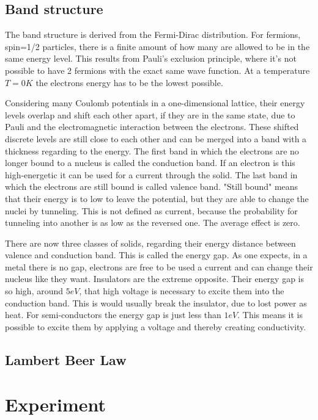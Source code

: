 \documentclass[]{article}
\begin{document}
\subsection{Band structure}
The band structure is derived from the Fermi-Dirac distribution. For fermions, spin=1/2 particles, there is a finite amount of how many are allowed to be in the same energy level. This results from Pauli's exclusion principle, where it's not possible to have 2 fermions with the exact same wave function. At a temperature $T=0K$ the electrons energy has to be the lowest possible. 

Considering many Coulomb potentials in a one-dimensional lattice, their energy levels overlap and shift each other apart, if they are in the same state, due to Pauli and the electromagnetic interaction between the electrons. These shifted discrete levels are still close to each other and can be merged into a band with a thickness regarding to the energy. The first band in which the electrons are no longer bound to a nucleus is called the conduction band. If an electron is this high-energetic it can be used for a current through the solid. The last band in which the electrons are still bound is called valence band. "Still bound" means that their energy is to low to leave the potential, but they are able to change the nuclei by tunneling. This is not defined as current, because the probability for tunneling into another is as low as the reversed one. The average effect is zero.

There are now three classes of solids, regarding their energy distance between valence and conduction band. This is called the energy gap. As one expects, in a metal there is no gap, electrons are free to be used a current and can change their nucleus like they want. Insulators are the extreme opposite. Their energy gap is so high, around $5eV$, that high voltage is necessary to excite them into the conduction band. This is would usually break the insulator, due to lost power as heat. 
For semi-conductors the energy gap is just less than $1eV$. This means it is possible to excite them by applying a voltage and thereby creating conductivity.


\subsection{Lambert Beer Law}


\section{Experiment}
\end{document}
